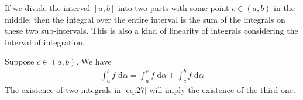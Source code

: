 \documentclass[thmcnt=section, 12pt]{my-elegantbook}
\begin{document}

\par If we divide the interval $[a, b]$ into two parts with some point $c \in (a, b)$ in the middle, then the integral over the entire interval is the sum of the integrals on these two sub-intervals. This is also a kind of linearity of integrals considering the interval of integration. 

\begin{lemma}
    Suppose $c \in (a, b)$. We have 
    \begin{align}
        \int_a^b f \; \mathrm{d}\alpha
        = \int_a^c f \; \mathrm{d}\alpha
        + \int_c^b f \; \mathrm{d}\alpha
        \label{eq:27}
    \end{align}
    The existence of two integrals in \eqref{eq:27} will imply the existence of the third one.
\end{lemma}
\end{document}

